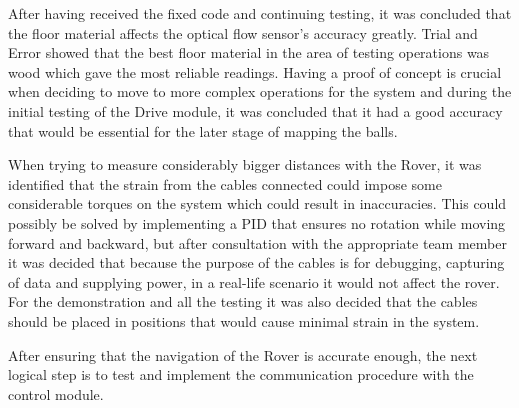 \documentclass[a4paper]{article}
\begin{document}
After having received the fixed code and continuing testing, it was concluded that the floor material affects the optical flow sensor's accuracy greatly. Trial and Error showed that the best floor material in the area of testing operations was wood which gave the most reliable readings.
Having a proof of concept is crucial when deciding to move to more complex operations for the system and during the initial testing of the Drive module, it was concluded that it had a good accuracy that would be essential for the later stage of mapping the balls.

When trying to measure considerably bigger distances with the Rover, it was identified that the strain from the cables connected could impose some considerable torques on the system which could result in inaccuracies.
This could possibly be solved by implementing a PID that ensures no rotation while moving forward and backward, but after consultation with the appropriate team member it was decided that because the purpose of the cables is for debugging, capturing of data and supplying power, in a real-life scenario it would not affect the rover.
For the demonstration and all the testing it was also decided that the cables should be placed in positions that would cause minimal strain in the system. 

After ensuring that the navigation of the Rover is accurate enough, the next logical step is to test and implement the communication procedure with the control module.
\end{document}
